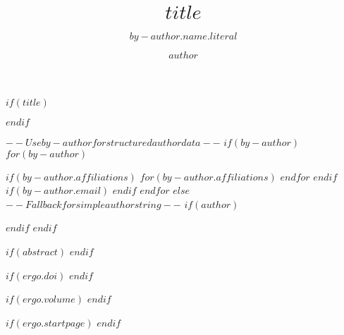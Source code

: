 $if(title)$
\title{$title$}
$endif$

$-- Use by-author for structured author data --$
$if(by-author)$
$for(by-author)$
\author{$by-author.name.literal$}
$if(by-author.affiliations)$
$for(by-author.affiliations)$
$endfor$
$endif$
$if(by-author.email)$
$endif$
$endfor$
$else$
$-- Fallback for simple author string --$
$if(author)$
\author{$author$}
$endif$
$endif$


$if(abstract)$
%
$endif$

$if(ergo.doi)$
$endif$

$if(ergo.volume)$
%
$endif$

$if(ergo.startpage)$
\setcounter{page}{$ergo.startpage$}%
$endif$

